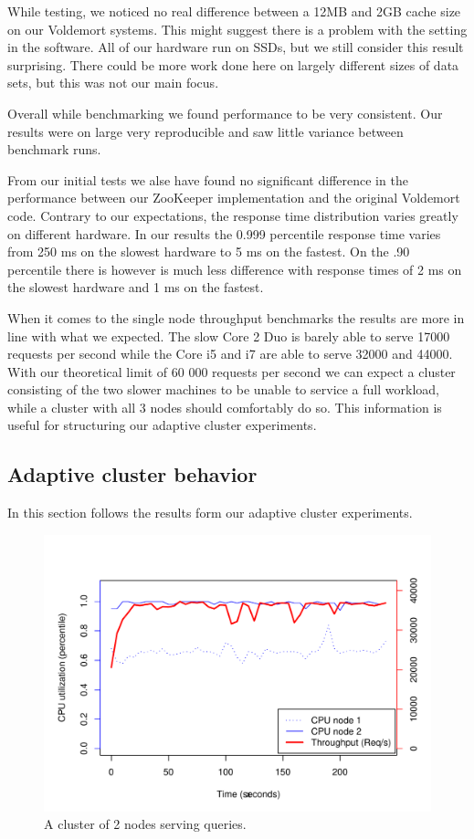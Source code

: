 While testing, we noticed no real difference between a 12MB and 2GB cache size on our Voldemort systems. This might suggest there is a problem with the setting in the software. All of our hardware run on SSDs, but we still consider this result surprising. There could be more work done here on largely different sizes of data sets, but this was not our main focus.

Overall while benchmarking we found performance to be very consistent. Our results were on large very reproducible and saw little variance between benchmark runs.

From our initial tests we alse have found no significant difference in the performance between our ZooKeeper implementation and the original Voldemort code. Contrary to our expectations, the response time distribution varies greatly on different hardware. In our results the 0.999 percentile response time varies from 250 ms on the slowest hardware to 5 ms on the fastest. On the .90 percentile there is however is much less difference with response times of 2 ms on the slowest hardware and 1 ms on the fastest.

When it comes to the single node throughput benchmarks the results are more in line with what we expected. The slow Core 2 Duo is barely able to serve 17000 requests per second while the Core i5 and i7 are able to serve 32000 and 44000. With our theoretical limit of 60 000 requests per second we can expect a cluster consisting of the two slower machines to be unable to service a full workload, while a cluster with all 3 nodes should comfortably do so. This information is useful for structuring our adaptive cluster experiments.

\clearpage
\subsection{Adaptive cluster behavior}
In this section follows the results form our adaptive cluster experiments.

\clearpage
\begin{figure}[h]
    \centering
    \includegraphics[width=1.2\textwidth]{results/baseline_slowpro_mini}
    \caption{A cluster of 2 nodes serving queries.}
    \label{fig:adaptive_base}
\end{figure}

